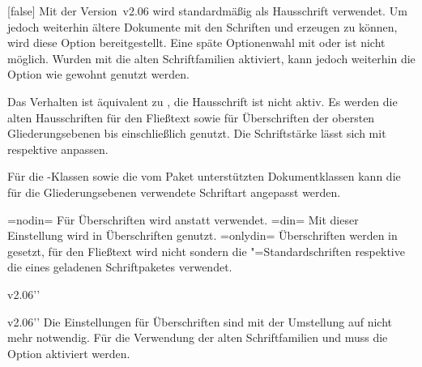 %
\begin{Declaration}[v2.06]{}[false]
\printdeclarationlist%
%
Mit der Version~v2.06 wird standardmäßig \OpenSans als Hausschrift verwendet. 
Um jedoch weiterhin ältere Dokumente mit den Schriften \Univers und \DIN 
erzeugen zu können, wird diese Option bereitgestellt.
 Eine späte Optionenwahl mit  oder  ist 
nicht möglich. Wurden mit  die alten Schriftfamilien 
aktiviert, kann jedoch weiterhin die Option  wie gewohnt 
genutzt werden.
%
\begin{DeclarationValues}
\itemvalfalse
  Das Verhalten ist äquivalent zu , die Hausschrift ist 
  nicht aktiv.
\itemvaltrue*
  Es werden die alten Hausschriften \Univers für den Fließtext sowie \DIN für 
  Überschriften der obersten Gliederungsebenen bis einschließlich 
   genutzt. Die Schriftstärke lässt sich mit 
   respektive  anpassen.
\end{DeclarationValues}
%
Für die \TUDScript-Klassen sowie die vom Paket  
unterstützten Dokumentklassen kann die für die Gliederungsebenen verwendete 
Schriftart angepasst werden.
%
\begin{DeclarationValues}
\itemval=nodin=
  Für Überschriften wird \Univers anstatt \DIN verwendet.
\itemval=din=
  Mit dieser Einstellung wird \DIN in Überschriften genutzt. 
\itemval=onlydin=
  Überschriften werden in \DIN gesetzt, für den Fließtext wird nicht \Univers 
  sondern die "=Standardschriften respektive die eines geladenen 
  Schriftpaketes verwendet.
\end{DeclarationValues}
\end{Declaration}

\begin{Obsolete}{v2.06}{}''
\begin{Obsolete}{v2.06}{}''
\printdeclarationlist%
%
Die Einstellungen für Überschriften sind mit der Umstellung auf \OpenSans nicht 
mehr notwendig. Für die Verwendung der alten Schriftfamilien \Univers und \DIN 
muss die Option  aktiviert werden.
\end{Obsolete}
\end{Obsolete}


